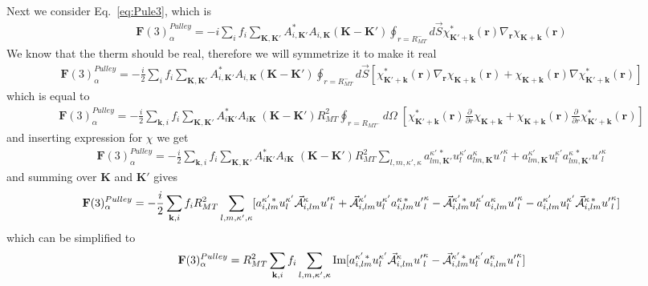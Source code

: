 \documentclass[aps,prb,floatfix,epsfig,singlecolumn,showpacs,preprintnumbers]{revtex4}
\newcommand{\vF}{{\mathbf{F}}}
\renewcommand{\vr}{{\mathbf{r}}}
\newcommand{\vk}{{\mathbf{k}}}
\newcommand{\vK}{{\mathbf{K}}}
\renewcommand{\Im}{\textrm{Im}}
\newcommand{\vcA}{\vec{\cal A}}
\begin{document}
Next we consider Eq.~\ref{eq:Pule3}, which is
\begin{eqnarray}
\vF(3)^{Pulley}_\alpha = 
-i\sum_i f_i \sum_{\vK,\vK'} A_{i,\vK'}^* A_{i,\vK}
(\vK-\vK') \oint_{r=R_{MT}^-} d\vec{S} \chi_{\vK'+\vk}^*(\vr)  \nabla_\vr\chi_{\vK+\vk}(\vr)
\label{eq:Pule3n}
\end{eqnarray}
We know that the therm should be real, therefore we will symmetrize it
to make it real
\begin{eqnarray}
\vF(3)^{Pulley}_\alpha = -\frac{i}{2}\sum_i f_i \sum_{\vK,\vK'} A_{i,\vK'}^* A_{i,\vK}
(\vK-\vK') \oint_{r=R_{MT}^-} d\vec{S} 
[\chi_{\vK'+\vk}^*(\vr)  \nabla_\vr\chi_{\vK+\vk}(\vr) +  \chi_{\vK+\vk}(\vr) \nabla \chi_{\vK'+\vk}^*(\vr)  ]
\label{eq:Pule3n}
\end{eqnarray}
which is equal to
\begin{eqnarray}
\vF(3)_\alpha^{Pulley}=-\frac{i}{2}\sum_{\vk,i} f_i 
\sum_{\vK,\vK'} A^*_{i\vK'} A_{i\vK}\; 
(\vK-\vK') R_{MT}^2
\oint_{r=R_{MT^-}} d\Omega\;  
[
\chi_{\vK'+\vk}^*(\vr) \frac{\partial}{\partial r}\chi_{\vK+\vk}+
\chi_{\vK+\vk}(\vr)  \frac{\partial}{\partial r}\chi_{\vK'+\vk}^*(\vr) 
]
\end{eqnarray}
and inserting expression for $\chi$ we get
\begin{eqnarray}
\vF(3)_\alpha^{Pulley}=-\frac{i}{2}\sum_{\vk,i} f_i 
\sum_{\vK,\vK'} A^*_{i\vK'} A_{i\vK}\; 
(\vK-\vK') R_{MT}^2
\sum_{l,m,\kappa',\kappa}
a_{lm,\vK'}^{\kappa'\,*} u_l^{\kappa'} a_{lm,\vK}^\kappa  {u'}_l^\kappa+
a_{lm,\vK}^{\kappa'} u_l^{\kappa'} a^{\kappa\,*}_{lm,\vK'} {u'}_l^\kappa
\end{eqnarray}
and summing over $\vK$ and $\vK'$ gives
\begin{eqnarray}
\vF(3)_\alpha^{Pulley}=-\frac{i}{2}\sum_{\vk,i} f_i 
R_{MT}^2
\sum_{l,m,\kappa',\kappa}
[
a_{i,lm}^{\kappa'\,*} u_l^{\kappa'} \vcA_{i,lm}^\kappa  {u'}_l^\kappa+
\vcA_{i,lm}^{\kappa'} u_l^{\kappa'} a^{\kappa\,*}_{i,lm}  {u'}_l^\kappa
-\vcA_{i,lm}^{\kappa'\,*} u_l^{\kappa'} a_{i,lm}^\kappa  {u'}_l^\kappa
-a_{i,lm}^{\kappa'} u_l^{\kappa'} \vcA^{\kappa\,*}_{i,lm} {u'}_l^\kappa
]
\end{eqnarray}
which can be simplified to
\begin{eqnarray}
\vF(3)_\alpha^{Pulley}=R_{MT}^2 \sum_{\vk,i} f_i
\sum_{l,m,\kappa',\kappa}
\Im[a_{i,lm}^{\kappa'\,*} u_l^{\kappa'} \vcA_{i,lm}^\kappa  {u'}_l^\kappa
-\vcA_{i,lm}^{\kappa'\,*} u_l^{\kappa'} a_{i,lm}^\kappa  {u'}_l^\kappa]
\end{eqnarray}
\end{document}
